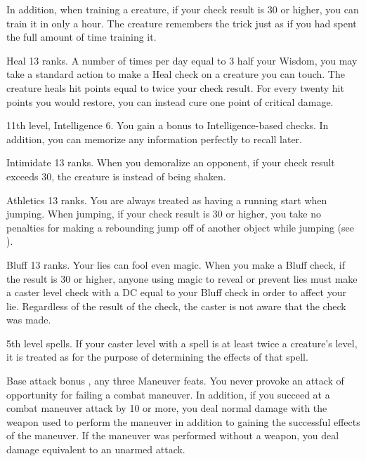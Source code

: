 In addition, when training a creature, if your check result is 30 or higher, you can train it in only a hour. The creature remembers the trick just as if you had spent the full amount of time training it.

\featpre Heal 13 ranks.
\featben A number of times per day equal to 3 \add half your Wisdom, you may take a standard action to make a Heal check on a creature you can touch. The creature heals hit points equal to twice your check result. For every twenty hit points you would restore, you can instead cure one point of critical damage.

\featpre 11th level, Intelligence 6.
\featben You gain a  bonus to Intelligence-based checks. In addition, you can memorize any information perfectly to recall later.

\featpre Intimidate 13 ranks.
\featben When you demoralize an opponent, if your check result exceeds 30, the creature is \frightened instead of being shaken.

\featpre Athletics 13 ranks.
\featben You are always treated as having a running start when jumping. When jumping, if your check result is 30 or higher, you take no penalties for making a rebounding jump off of another object while jumping (see ).

\featpre Bluff 13 ranks.
\featben Your lies can fool even magic. When you make a Bluff check, if the result is 30 or higher, anyone using magic to reveal or prevent lies must make a caster level check with a DC equal to your Bluff check in order to affect your lie. Regardless of the result of the check, the caster is not aware that the check was made.

\featpre 5th level spells.
\featben If your caster level with a spell is at least twice a creature's level, it is treated as \bloodied for the purpose of determining the effects of that spell.

\featpre Base attack bonus , any three Maneuver feats.
\featben You never provoke an attack of opportunity for failing a combat maneuver. In addition, if you succeed at a combat maneuver attack by 10 or more, you deal normal damage with the weapon used to perform the maneuver in addition to gaining the successful effects of the maneuver. If the maneuver was performed without a weapon, you deal damage equivalent to an unarmed attack.

